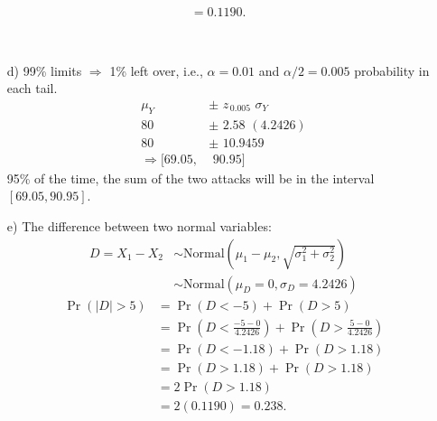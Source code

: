 \documentclass[12pt]{article}
\begin{document}
{\begin{minipage}[t]{0.98\textwidth}
\begin{minipage}[t]{0.47\textwidth}
\begin{enumerate}[a)]
\begin{align*}
&= 0.1190.
\end{align*}
\end{enumerate}
\end{minipage}\hspace{0.04\textwidth}
\begin{minipage}[t]{0.47\textwidth}
\quad\\[-1cm]
\begin{enumerate}
\item[d)] 99\% limits $\Rightarrow$ 1\% left over, i.e., $\alpha=0.01$ and $\alpha/2=0.005$ probability in each tail.
\begin{align*}
\mu_Y \,\,  &\pm \,\, z_{\,0.005}\,\, \sigma_Y \\[0.2cm]
80 \,\,  &\pm \,\, 2.58\,\, (4.2426)\\[0.2cm]
80 \,\,  &\pm \,\,  10.9459\\[0.2cm]
\Rightarrow [69.05,&\,\,90.95]
\end{align*}
95\% of the time, the sum of the two attacks will be in the interval $[69.05,90.95]$.
\item[e)] The difference between two normal variables:
\begin{align*}
D=X_1-X_2&\sim \text{Normal}\left(\mu_1-\mu_2,\sqrt{\sigma_1^2+\sigma_2^2}\right)\\
&\sim \text{Normal}\left(\mu_D=0,\sigma_D=4.2426\right)
\end{align*}
\begin{align*}
\Pr(|D|>5) &= \Pr(D < -5) + \Pr(D>5)\\
&= \Pr(D < \tfrac{-5-0}{4.2426}) + \Pr(D>\tfrac{5-0}{4.2426})\\
&= \Pr(D < -1.18) + \Pr(D>1.18)\\
&= \Pr(D > 1.18) + \Pr(D>1.18)\\
&= 2\Pr(D > 1.18)\\
&=2(0.1190) =0.238.
\end{align*}
\end{enumerate}
\end{minipage}
\end{minipage}}\vspace{0.03\textwidth}
\end{document}
